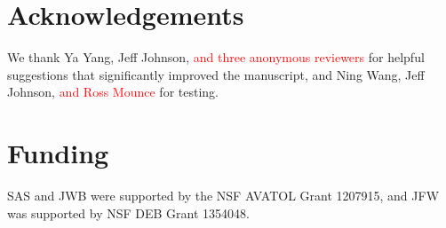 \documentclass{bioinfo}
\begin{document}
\section*{Acknowledgements}

We thank Ya Yang, Jeff Johnson, \textcolor{red}{and three anonymous reviewers} for helpful suggestions that significantly improved the manuscript, and Ning Wang, Jeff Johnson, \textcolor{red}{and Ross Mounce} for testing.\vspace*{-12pt}

\section*{Funding}

SAS and JWB were supported by the NSF AVATOL Grant 1207915, and JFW was supported by NSF DEB Grant 1354048. \vspace*{-12pt}


%
%
%
%
%
%

\end{document}
